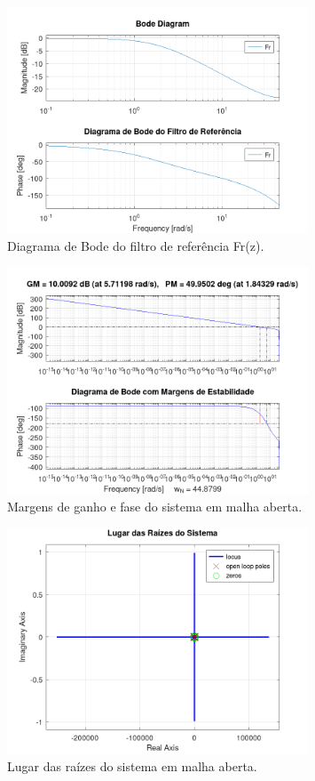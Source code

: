 \documentclass[a4paper,12pt]{report}
\begin{document}
\begin{figure}[H]
    \centering
    \includegraphics[width=0.8\textwidth]{figura_bode_filtro.png}
    \caption{Diagrama de Bode do filtro de referência Fr(z).}
    \label{fig:bode_filtro}
\end{figure}

\begin{figure}[H]
    \centering
    \includegraphics[width=0.8\textwidth]{figura_margens_estabilidade.png}
    \caption{Margens de ganho e fase do sistema em malha aberta.}
    \label{fig:margens}
\end{figure}

\begin{figure}[H]
    \centering
    \includegraphics[width=0.8\textwidth]{figura_lugar_raizes.png}
    \caption{Lugar das raízes do sistema em malha aberta.}
    \label{fig:lr}
\end{figure}
\end{document}
